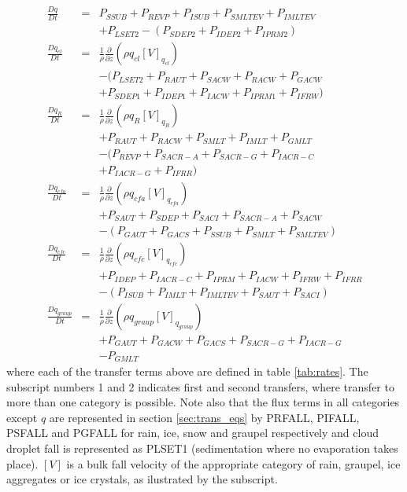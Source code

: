 \documentclass{UMDP_article}
\begin{document}
\begin{eqnarray}
\frac{D q}{Dt}&=&P_{SSUB}+P_{REVP}+P_{ISUB}
      +P_{SMLTEV}+P_{IMLTEV}     \nonumber \\
      & & +P_{LSET2} -(P_{SDEP2}+P_{IDEP2}+P_{IPRM2} )
                                                           \\[0.6cm]
\frac{D q_{cl}}{Dt}&=&\frac{1}{\rho}\frac{\partial}{\partial z}
       (\rho q_{cl} [V]_{q_{cl}}) \nonumber \\
&& -(P_{LSET2} + P_{RAUT}+P_{SACW}+P_{RACW}+P_{GACW}\nonumber\\
      & & + P_{SDEP1}+ P_{IDEP1} + P_{IACW} + P_{IPRM1}+P_{IFRW} )
                                                           \\[0.6cm]
\frac{D q_R}{Dt}&=&\frac{1}{\rho}\frac{\partial}{\partial z}
       (\rho q_R [V]_{q_R})                              \nonumber\\
       &&+P_{RAUT}+P_{RACW}+P_{SMLT}+P_{IMLT}+P_{GMLT} \nonumber \\
      & &     -(P_{REVP}+P_{SACR-A}+P_{SACR-G}+P_{IACR-C} \nonumber \\
      & &     + P_{IACR-G}+P_{IFRR})
                                                           \\[0.6cm]
\frac{D q_{cfa}}{Dt}&=&\frac{1}{\rho}\frac{\partial}{\partial z}
       (\rho q_{cfa} [V]_{q_{cfa}})  \nonumber    \\
      & &+P_{SAUT}+ P_{SDEP}+P_{SACI}+P_{SACR-A}+P_{SACW} \nonumber   \\
      & &      -(P_{GAUT}+P_{GACS}+P_{SSUB}+P_{SMLT}+P_{SMLTEV})
                                                           \\[0.6cm]
\frac{D q_{cfc}}{Dt}&=&\frac{1}{\rho}\frac{\partial}{\partial z}
       (\rho q_{cfc} [V]_{q_{cfc}})     \nonumber    \\
     & &+P_{IDEP}+P_{IACR-C}+P_{IPRM}+P_{IACW} + P_{IFRW} +P_{IFRR} \nonumber    \\
    & & -(P_{ISUB} +  P_{IMLT} + P_{IMLTEV} + P_{SAUT} + P_{SACI})
                                                           \\[0.6cm]
\frac{D q_{graup}}{Dt} &=& \frac{1}{\rho}\frac{\partial}{\partial z}
       (\rho q_{graup} [V]_{q_{graup}} ) \nonumber \\
    & &+P_{GAUT}+P_{GACW}+P_{GACS}+P_{SACR-G}+P_{IACR-G} \nonumber \\
    & &- P_{GMLT}
\end{eqnarray}
where each of the transfer terms above are defined in table \ref{tab:rates}. The
subscript
numbers 1 and 2 indicates first and second transfers, where transfer to 
more than one category is possible. Note also that the flux terms in
all categories except $q$ are represented in section \ref{sec:trans_eqs}
by PRFALL, PIFALL, PSFALL and PGFALL for rain, ice, snow and graupel
respectively and cloud droplet fall is represented as PLSET1 (sedimentation
where no evaporation takes place). $[V]$ is a bulk fall
velocity of the appropriate category of rain, graupel, ice aggregates or ice crystals, as
ilustrated by the subscript. 
\end{document}
